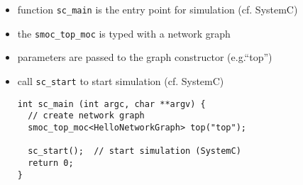 \begin{frame}[fragile=singleslide]
\begin{itemize}
\item function \lstinline!sc_main! is the entry point for simulation (cf. SystemC)
\item the \lstinline!smoc_top_moc! is typed with a network graph
\item parameters are passed to the graph constructor (e.g.``top'')
\item call \lstinline!sc_start! to start simulation (cf. SystemC)
\begin{lstlisting}
int sc_main (int argc, char **argv) {
  // create network graph
  smoc_top_moc<HelloNetworkGraph> top("top");

  sc_start();  // start simulation (SystemC)
  return 0;
}
\end{lstlisting}
\end{itemize}
\end{frame}
